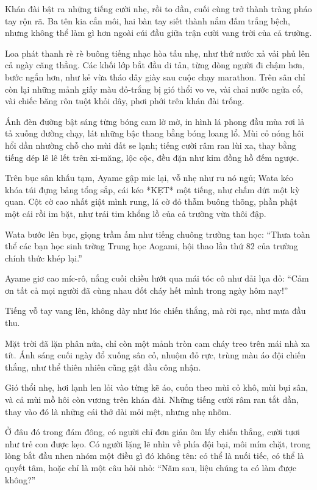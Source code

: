 \documentclass[../main.tex]{subfiles}
\begin{document}
Khán đài bật ra những tiếng cười nhẹ, rồi to dần, cuối cùng trở thành tràng pháo tay rộn rã. Ba tên kia cắn môi, hai bàn tay siết thành nắm đấm trắng bệch, nhưng không thể làm gì hơn ngoài cúi đầu giữa trận cười vang trời của cả trường.

\ct

Loa phát thanh rè rè buông tiếng nhạc hòa tấu nhẹ, như thứ nước xả vải phủ lên cả ngày căng thẳng. Các khối lớp bắt đầu di tản, từng dòng người đi chậm hơn, bước ngắn hơn, như kẻ vừa tháo dây giày sau cuộc chạy marathon. Trên sân chỉ còn lại những mảnh giấy màu đỏ-trắng bị gió thổi vo ve, vài chai nước ngửa cổ, vài chiếc băng rôn tuột khỏi dây, phơi phới trên khán đài trống.

Ánh đèn đường bật sáng từng bóng cam lờ mờ, in hình lá phong đầu mùa rơi lả tả xuống đường chạy, lát những bậc thang bằng bóng loang lổ. Mùi cỏ nóng hôi hổi dần nhường chỗ cho mùi đất se lạnh; tiếng cười râm ran lùi xa, thay bằng tiếng dép lê lê lết trên xi-măng, lộc cộc, đều đặn như kim đồng hồ đếm ngược.

Trên bục sân khấu tạm, Ayame gập mic lại, vỗ nhẹ như ru nó ngủ; Wata kéo khóa túi đựng bảng tổng sắp, cái kéo *KẸT* một tiếng, như chấm dứt một kỳ quan. Cột cờ cao nhất giật mình rung, lá cờ đỏ thẫm buông thõng, phần phật một cái rồi im bặt, như trái tim khổng lồ của cả trường vừa thôi đập.

Wata bước lên bục, giọng trầm ấm như tiếng chuông trường tan học: ``Thưa toàn thể các bạn học sinh trờng Trung học Aogami, hội thao lần thứ 82 của trường chính thức khép lại.''

Ayame giơ cao míc-rô, nắng cuối chiều lướt qua mái tóc cô như dải lụa đỏ: ``Cảm ơn tất cả mọi người đã cùng nhau đốt cháy hết mình trong ngày hôm nay!''

Tiếng vỗ tay vang lên, không dày như lúc chiến thắng, mà rời rạc, như mưa đầu thu.

Mặt trời đã lặn phân nửa, chỉ còn một mảnh tròn cam cháy treo trên mái nhà xa tít. Ánh sáng cuối ngày đổ xuống sân cỏ, nhuộm đỏ rực, trùng màu áo đội chiến thắng, như thể thiên nhiên cũng gật đầu công nhận.

Gió thổi nhẹ, hơi lạnh len lỏi vào từng kẽ áo, cuốn theo mùi cỏ khô, mùi bụi sân, và cả mùi mồ hôi còn vương trên khán đài. Những tiếng cười râm ran tắt dần, thay vào đó là những cái thở dài mỏi mệt, nhưng nhẹ nhõm.

Ở đâu đó trong đám đông, có người chỉ đơn giản ôm lấy chiến thắng, cười tươi như trẻ con được kẹo. Có người lặng lẽ nhìn về phía đội bại, môi mím chặt, trong lòng bắt đầu nhen nhóm một điều gì đó không tên: có thể là nuối tiếc, có thể là quyết tâm, hoặc chỉ là một câu hỏi nhỏ: ``Năm sau, liệu chúng ta có làm được không?''
\end{document}
